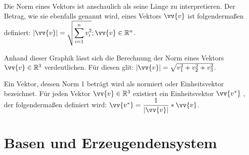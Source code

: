       \begin{Bemerkung}
        \begin{Definition}
        Die Norm eines Vektors ist anschaulich als seine Länge zu interpretieren. Der Betrag, wie sie ebenfalls genannt wird, eines
         Vektors $\vv{v}$ ist folgendermaßen definiert: $\text{|}\vv{v}\text{|} = \sqrt{\displaystyle\sum_{i=1}^{n}v_{i}^2} ; \vv{v}\in\R^n$.
        \end{Definition}
        \begin{minipage}{0.5\textwidth}
        \end{minipage}
        \begin{minipage}{0.5\textwidth}
          Anhand dieser Graphik lässt sich die Berechnung der Norm eines Vektors $\vv{v}\in\R^3$ verdeutlichen. Für diesen glit:
          $\text{|}\vv{v}\text{|}=\sqrt{v_1^{2}+v_2^{2}+v_3^{2}}$.
        \end{minipage}
      \end{Bemerkung}

      \begin{Definition}
        Ein Vektor, dessen Norm 1 beträgt wird als normiert oder Einheitsvektor bezeichnet. Für jeden Vektor $\vv{v}\in\R^{3}$ existiert ein Einheitsvektor $\vv{v^{*}}$ , der folgendermaßen definiert wird: $\vv{v^{*}}=\dfrac{1}{\text{|}\vv{v}\text{|}}*\vv{v}$.
      \end{Definition}




\section{Basen und Erzeugendensystem}

